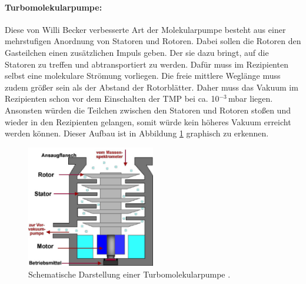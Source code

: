  \paragraph{Turbomolekularpumpe:}
 Diese von Willi Becker verbesserte Art der Molekularpumpe besteht aus einer mehrstufigen Anordnung von Statoren und Rotoren. Dabei sollen die
 Rotoren den Gasteilchen einen zusätzlichen Impuls geben. Der sie dazu bringt, auf die Statoren zu treffen und abtransportiert zu werden. Dafür
 muss im Rezipienten selbst eine molekulare Strömung vorliegen. Die freie mittlere Weglänge muss zudem größer sein als der Abstand der Rotorblätter.
 Daher muss das Vakuum im Rezipienten schon vor dem Einschalten der TMP bei ca. 10$^{-3}\,$mbar liegen. Ansonsten würden die Teilchen zwischen
 den Statoren und Rotoren stoßen und wieder in den Rezipienten gelangen, somit würde kein höheres Vakuum erreicht werden können.
 Dieser Aufbau ist in Abbildung \ref{fig:TMP} graphisch zu erkennen.
\begin{figure}
  \centering
  \includegraphics[width=0.5\textwidth]{TMP.JPG}
  \caption{Schematische Darstellung einer Turbomolekularpumpe \cite{TMP}.}
  \label{fig:TMP}
\end{figure}
\FloatBarrier

